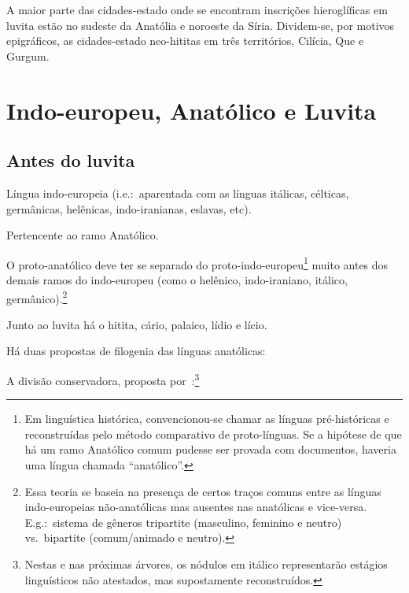 \documentclass[article]{luvita}
\begin{document}
A maior parte das cidades-estado onde se encontram inscrições hieroglíficas em
luvita estão no sudeste da Anatólia e noroeste da Síria.
Dividem-se, por motivos epigráficos, as cidades-estado neo-hititas em três
territórios, Cilícia, Que e Gurgum.

\clearpage
\chapter{Indo-europeu, Anatólico e Luvita}

\section{Antes do luvita}

\begin{compactitem}
	\item Língua indo-europeia (i.e.:\ aparentada com as línguas itálicas,
	célticas, germânicas, helênicas, indo-iranianas, eslavas, etc).
	\item Pertencente ao ramo Anatólico.
	\begin{compactitem}
		\item O proto-anatólico deve ter se separado do
		proto-indo-europeu\footnote{Em linguística histórica, convencionou-se
			chamar as línguas pré-históricas e reconstruídas pelo método comparativo
			de proto-línguas. Se a hipótese de que há um ramo Anatólico comum
			pudesse ser provada com documentos, haveria uma língua chamada
			``anatólico''.}
		muito antes dos demais ramos do indo-europeu (como o helênico,
		indo-iraniano, itálico, germânico).\footnote{Essa teoria se baseia na
			presença de certos traços comuns entre as línguas indo-europeias
			não-anatólicas mas ausentes nas anatólicas e vice-versa. E.g.:\ sistema de
			gêneros tripartite (masculino, feminino e neutro) vs.\ bipartite
			(comum\slash{}animado e neutro).}
		\item Junto ao luvita há o hitita, cário, palaico, lídio e lício.
		\item Há duas propostas de filogenia das línguas anatólicas:
		\begin{compactitem}
			\item A divisão conservadora,  proposta por~\citet[305--6]{Rieken2017}:\footnote{Nestas e nas
				próximas árvores, os nódulos em itálico representarão estágios linguísticos
				não atestados, mas supostamente reconstruídos.}
			\vspace{3pt}
			\begin{center}
				\begin{tikzpicture}

\end{tikzpicture}
\end{center}
\end{compactitem}
\end{compactitem}
\end{compactitem}
\end{document}
